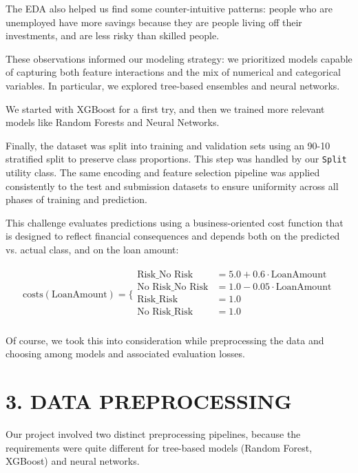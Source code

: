 \documentclass[12pt]{report}
\begin{document}
The EDA also helped us find some counter-intuitive patterns: people who are unemployed have more savings because they are people living off their investments, and are less risky than skilled people.

These observations informed our modeling strategy: we prioritized models capable of capturing both feature interactions and the mix of numerical and categorical variables. In particular, we explored tree-based ensembles and neural networks.

We started with XGBoost for a first try, and then we trained more relevant models like Random Forests and Neural Networks.



Finally, the dataset was split into training and validation sets using an 90-10 stratified split to preserve class proportions. This step was handled by our \texttt{Split} utility class. The same encoding and feature selection pipeline was applied consistently to the test and submission datasets to ensure uniformity across all phases of training and prediction.

This challenge evaluates predictions using a business-oriented cost function that is designed to reflect financial consequences and depends both on the predicted vs. actual class, and on the loan amount:

\begin{align*}
\text{costs}(\text{LoanAmount}) = \bigg\{ 
\begin{array}{ll}
\text{Risk\_No Risk} & = 5.0 + 0.6 \cdot \text{LoanAmount} \\
\text{No Risk\_No Risk} & = 1.0 - 0.05 \cdot \text{LoanAmount} \\
\text{Risk\_Risk} & = 1.0 \\
\text{No Risk\_Risk} & = 1.0 \\
\end{array}
\end{align*}

Of course, we took this into consideration while preprocessing the data and choosing among models and associated evaluation losses.


\section*{3. DATA PREPROCESSING}

Our project involved two distinct preprocessing pipelines, because the requirements were quite different for tree-based models (Random Forest, XGBoost) and neural networks.
\end{document}
